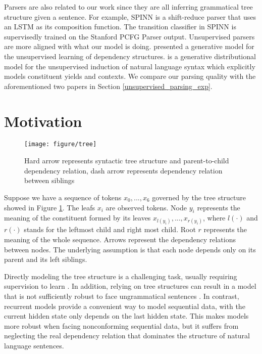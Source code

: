 \documentclass{article} \usepackage{iclr2018_conference,times}
\begin{document}
Parsers are also related to our work since they are all inferring grammatical tree structure given a sentence. For example, SPINN \citep{bowman2016fast} is a shift-reduce parser that uses an LSTM as its composition function. The transition classifier in SPINN is supervisedly trained on the Stanford PCFG Parser \citep{Klein:2003:AUP:1075096.1075150} output. Unsupervised parsers are more aligned with what our model is doing. \cite{klein2004corpus} presented a generative model for the unsupervised learning of dependency structures. \cite{klein2002generative} is a generative distributional model for the unsupervised induction of natural language syntax which explicitly models constituent yields and contexts. We compare our parsing quality with the aforementioned two papers in Section \ref{unsupervised_parsing_exp}.















\section{Motivation}
\begin{figure}[h]
  \centering
  \texttt{[image: figure/tree]}
  \caption{Hard arrow represents syntactic tree structure and parent-to-child dependency relation, dash arrow represents dependency relation between siblings}
  \label{fig_tree}
\end{figure}

Suppose we have a sequence of tokens $x_0,...,x_6$ governed by the tree structure showed in Figure \ref{fig_tree}. The leafs ${x_i}$ are observed tokens. Node $y_i$ represents the meaning of the constituent formed by its leaves $x_{l(y_i)},...,x_{r(y_i)}$, where $l(\cdot)$ and $r(\cdot)$ stands for the leftmost child and right most child. Root $r$ represents the meaning of the whole sequence. Arrows represent the dependency relations between nodes. The underlying assumption is that each node depends only on its parent and its left siblings. 

Directly modeling the tree structure is a challenging task, usually requiring supervision to learn \citep{tai2015improved}. In addition, relying on tree structures can result in a model that is not sufficiently robust to face ungrammatical sentences \citep{hashemi2016evaluation}. 
In contrast, recurrent models provide a convenient way to model sequential data, with the current hidden state only depends on the last hidden state. This makes models more robust when facing nonconforming sequential data, but it suffers from neglecting the real dependency relation that dominates the structure of natural language sentences.
\end{document}
